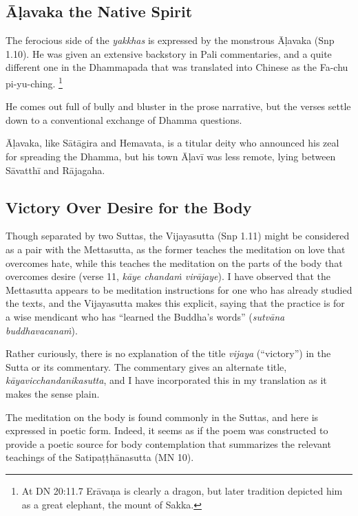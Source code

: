 \documentclass[12pt,openany]{book}%
\begin{document}
\subsection*{\textsanskrit{Āḷavaka} the Native Spirit}

The ferocious side of the \textit{yakkhas} is expressed by the monstrous \textsanskrit{Āḷavaka} (Snp 1.10). He was given an extensive backstory in Pali commentaries, and a quite different one in the Dhammapada that was translated into Chinese as the Fa-chu pi-yu-ching. \footnote{At DN 20:11.7 \textsanskrit{Erāvaṇa} is clearly a dragon, but later tradition depicted him as a great elephant, the mount of Sakka. }

He comes out full of bully and bluster in the prose narrative, but the verses settle down to a conventional exchange of Dhamma questions.

\textsanskrit{Āḷavaka}, like \textsanskrit{Sātāgira} and Hemavata, is a titular deity who announced his zeal for spreading the Dhamma, but his town \textsanskrit{Āḷavī} was less remote, lying between \textsanskrit{Sāvatthī} and \textsanskrit{Rājagaha}.

\subsection*{Victory Over Desire for the Body}

Though separated by two Suttas, the Vijayasutta (Snp 1.11) might be considered as a pair with the Mettasutta, as the former teaches the meditation on love that overcomes hate, while this teaches the meditation on the parts of the body that overcomes desire (verse 11, \textit{\textsanskrit{kāye} \textsanskrit{chandaṁ} \textsanskrit{virājaye}}). I have observed that the Mettasutta appears to be meditation instructions for one who has already studied the texts, and the Vijayasutta makes this explicit, saying that the practice is for a wise mendicant who has “learned the Buddha’s words” (\textit{\textsanskrit{sutvāna} \textsanskrit{buddhavacanaṁ}}).

Rather curiously, there is no explanation of the title \textit{vijaya} (“victory”) in the Sutta or its commentary. The commentary gives an alternate title, \textit{\textsanskrit{kāyavicchandanikasutta}}, and I have incorporated this in my translation as it makes the sense plain.

The meditation on the body is found commonly in the Suttas, and here is expressed in poetic form. Indeed, it seems as if the poem was constructed to provide a poetic source for body contemplation that summarizes the relevant teachings of the \textsanskrit{Satipaṭṭhānasutta} (MN 10).
\end{document}
